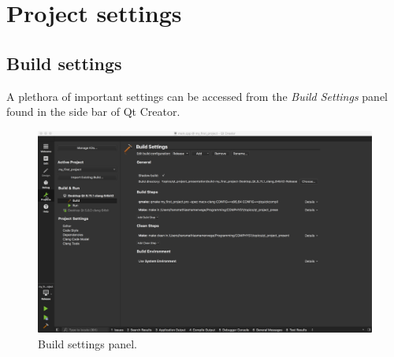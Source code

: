 \documentclass[11pt]{article}
\begin{document}
\section{Project settings}
\subsection{Build settings}
A plethora of important settings can be accessed from the \textit{Build Settings} panel found in the side bar of Qt Creator.
\begin{figure}[H]
    \centering
    \includegraphics[width=\textwidth]{figures/changing_build_settings/build_settings_panel.png}
    \caption{Build settings panel.}
    \label{fig:build-settings}
\end{figure}
\end{document}
